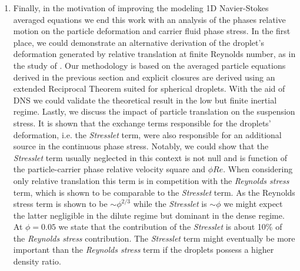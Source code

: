 \begin{enumerate}
\item Finally,  in the motivation of improving the modeling 1D Navier-Stokes averaged equations we end this work with an analysis of the phases relative motion on the particle deformation and carrier fluid phase stress. 
In the first place, we could demonstrate an alternative derivation of the droplet's deformation generated by relative translation at finite Reynolds number, as in the study of \citet{taylor1964deformation}. 
Our methodology is based on the averaged particle equations derived in the previous section and explicit closures are derived using an extended Reciprocal Theorem suited for spherical droplets. 
With the aid of DNS we could validate the theoretical result in the low but finite inertial regime. 
Lastly, we discuss the impact of particle translation on the suspension stress. 
It is shown that the exchange terms responsible for the droplets' deformation, i.e. the \textit{Stresslet} term, were also responsible for an additional source in the continuous phase stress. 
Notably, we could show that the \textit{Stresslet} term usually neglected in this context is not null and is function of the particle-carrier phase relative velocity square and $\phi Re$.  
When considering only relative translation this term is in competition with the \textit{Reynolds stress} term, which is shown to be comparable to the \textit{Stresslet} term. 
As the Reynolds stress term is shown to be $\sim \phi^{2/3}$ while the \textit{Stresslet} is $\sim \phi$ we might expect the latter negligible in the dilute regime but dominant in the dense regime. 
At $\phi = 0.05$ we state that the contribution of the \textit{Stresslet} is about 10\% of the \textit{Reynolds stress} contribution. 
The \textit{Stresslet} term might eventually be more important than the \textit{Reynolds stress} term if the droplets possess a higher density ratio. 
\end{enumerate}
